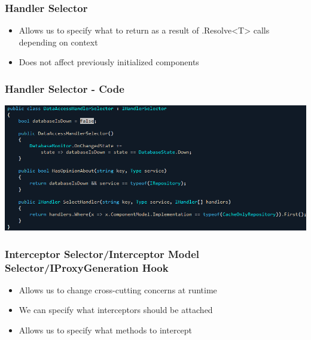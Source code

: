\documentclass[turkish,handout]{beamer}
\begin{document}
				\frame
				{	
					\frametitle{Handler Selector}
			  	\begin{itemize}
			  		\item<1->Allows us to specify what to return as a result of .Resolve<T> calls depending on context 
			  		\item<2->Does not affect previously initialized components
			  	\end{itemize}
			 }
			 	\frame
				{
					\frametitle{Handler Selector - Code}
					\begin{center}
						\includegraphics[scale=0.40]{images/handlerselector.png}
					\end{center}
	    	 }
	    	\frame
				{
					\frametitle{Interceptor Selector/Interceptor Model Selector/IProxyGeneration Hook}
			  	\begin{itemize}
			  	  \item<1->Allows us to change cross-cutting concerns at runtime
			  		\item<2->We can specify what interceptors should be attached
			  		\item<3->Allows us to specify what methods to intercept
			  	\end{itemize}
			 }
\end{document}
